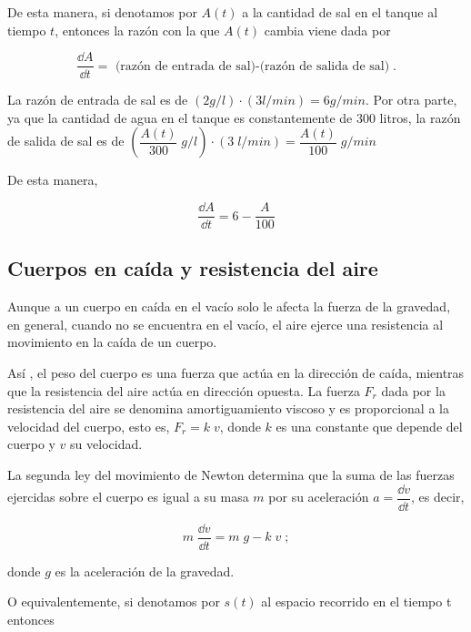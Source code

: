 De esta manera, si denotamos por $A(t)$ a la cantidad de sal en el tanque al tiempo $t$, entonces la razón con la que $A(t)$ cambia viene dada por 
   
   \begin{equation*}
   	\dfrac {\dd A}{\dd t}= \text{ (razón de entrada de sal)-(razón de salida de sal)}\; .
   \end{equation*}
   
La razón de entrada de sal es de $(2g/l) \cdot (3l/min) = 6g/min$. Por otra parte, ya que la cantidad de agua en el tanque es constantemente de $300$ litros, la 
razón de salida de sal es de $\displaystyle \left(\dfrac {A(t)}{300}\; g/l \right) \cdot \left( 3 \; l/min \right)=\dfrac {A(t)}{100}\; g/min$
   
De esta manera, 
   
   \begin{equation*}
   	\dfrac {\dd A}{\dd t}=6-\dfrac {A}{100}
   \end{equation*}
   

\subsection{Cuerpos en caída y resistencia del aire}
   
Aunque a un cuerpo en caída en el vacío solo le afecta la fuerza de la gravedad, en general, cuando no se encuentra en el vacío, el aire ejerce una resistencia al movimiento en la caída de un cuerpo. 
   
   Así , el peso del cuerpo es una fuerza que actúa en la dirección de  caída, mientras que la resistencia del aire actúa en dirección opuesta. La fuerza $F_r$ dada por la resistencia del aire se denomina amortiguamiento viscoso y es proporcional a la velocidad del cuerpo, esto es, $F_r = k\; v$, donde $k$ es una constante que depende del cuerpo y $v$ su velocidad. 
   
	La segunda ley del movimiento de Newton determina que la suma de las fuerzas ejercidas sobre el cuerpo es igual a su masa $m$ por su aceleración $a=\dfrac {\dd v}{\dd t}$, es decir, 
   
\begin{equation*}
	m\; \dfrac {\dd v}{\dd t} = m\; g - k\; v\;;
\end{equation*} 
   
donde $g$ es la aceleración de la gravedad.
   
   O equivalentemente, si denotamos por $s(t)$ al espacio recorrido en el tiempo t entonces 
   
